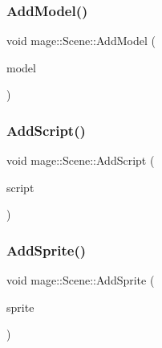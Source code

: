 \subsubsection{\texorpdfstring{Add\+Model()}{AddModel()}}
{\footnotesize\ttfamily void mage\+::\+Scene\+::\+Add\+Model (\begin{DoxyParamCaption}\item[{\hyperlink{namespacemage_a1e01ae66713838a7a67d30e44c67703e}{Shared\+Ptr}$<$ \hyperlink{classmage_1_1_model_node}{Model\+Node} $>$}]{model }\end{DoxyParamCaption})\hspace{0.3cm}{\ttfamily [private]}}

\hypertarget{classmage_1_1_scene_ab97b66c81c32681699052e154d0e0722}{}\label{classmage_1_1_scene_ab97b66c81c32681699052e154d0e0722} 
\subsubsection{\texorpdfstring{Add\+Script()}{AddScript()}}
{\footnotesize\ttfamily void mage\+::\+Scene\+::\+Add\+Script (\begin{DoxyParamCaption}\item[{\hyperlink{namespacemage_a1e01ae66713838a7a67d30e44c67703e}{Shared\+Ptr}$<$ \hyperlink{classmage_1_1_behavior_script}{Behavior\+Script} $>$}]{script }\end{DoxyParamCaption})}

\hypertarget{classmage_1_1_scene_a735a4eba6bf6a072195f1cfc58dfca47}{}\label{classmage_1_1_scene_a735a4eba6bf6a072195f1cfc58dfca47} 
\subsubsection{\texorpdfstring{Add\+Sprite()}{AddSprite()}}
{\footnotesize\ttfamily void mage\+::\+Scene\+::\+Add\+Sprite (\begin{DoxyParamCaption}\item[{\hyperlink{namespacemage_a1e01ae66713838a7a67d30e44c67703e}{Shared\+Ptr}$<$ \hyperlink{classmage_1_1_sprite_object}{Sprite\+Object} $>$}]{sprite }\end{DoxyParamCaption})}

\hypertarget{classmage_1_1_scene_a916cc7a0867bf1c09e5d10de53192140}{}\label{classmage_1_1_scene_a916cc7a0867bf1c09e5d10de53192140} 
